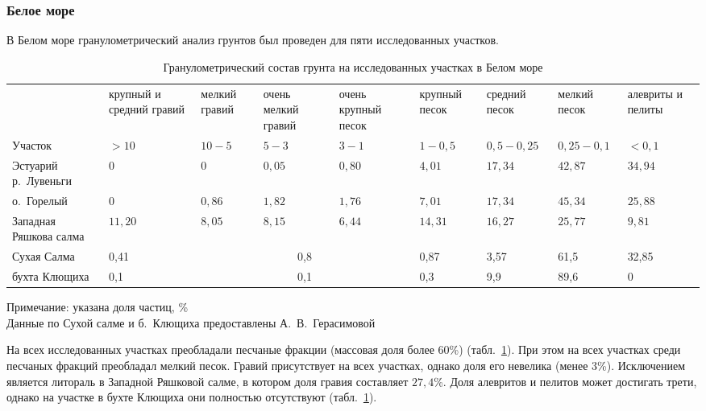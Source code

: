             \subsubsection{Белое море}
В Белом море гранулометрический анализ грунтов был проведен для пяти исследованных участков.
    \begin{table}[p]
    \caption{Гранулометрический состав грунта на исследованных участках в Белом море}
    \label{tab:grunt_granulometriya_White}
    \begin{tabularx}{\textwidth}{|p{}|*{8}{X|}} \hline
    & круп\-ный и сред\-ний гравий  &  мел\-кий гра\-вий &  очень мел\-кий гра\-вий & очень круп\-ный песок & круп\-ный песок &  сред\-ний песок & мел\-кий песок & алеври\-ты и пели\-ты \\
        Участок &   $>10$ &  $10-5$ &   $5-3$ &  $3-1$ & $1-0,5$ &   $0,5-0,25$ &    $0,25-0,1$ &    $<0,1$
        \\ \hline
	Эстуарий р.~Лувеньги           & $0$  & $0$ & $0,05$ & $0,80$ & $4,01$  & $17,34$  & $42,87$ & $34,94$          \\ \hline
	о.~Горелый   & $0$  & $0,86$ & $1,82$ & $1,76$ & $7,01$  & $17,34$  & $45,34$ & $25,88$          \\ \hline
	Западная Ряшкова салма& $11,20$ & $8,05$ & $8,15$ & $6,44$ & $14,31$ & $16,27$  & $25,77$ & $9,81$           \\         \hline
	Сухая Салма                    & 0,41           & \multicolumn{3}{c|}{0,8}    & 0,87            & 3,57             & 61,5            & 32,85             \\ \hline
	бухта Клющиха                  & 0,1            & \multicolumn{3}{c|}{0,1}    & 0,3             & 9,9              & 89,6            & 0                 \\ \hline
    \end{tabularx}

    {\footnotesize Примечание: указана доля частиц, \% \\
Данные по Сухой салме и б.~Клющиха предоставлены А.~В.~Герасимовой}
    \end{table}
На всех исследованных участках преобладали песчаные фракции (массовая доля более $60$\%) (табл.~\ref{tab:grunt_granulometriya_White}).
При этом на всех участках среди песчаных фракций преобладал мелкий песок.
Гравий присутствует на всех участках, однако доля его невелика (менее $3$\%).
Исключением является литораль в Западной Ряшковой салме, в котором доля гравия составляет $27,4$\%.
Доля алевритов и пелитов может достигать трети, однако на участке в бухте Клющиха они полностью отсутствуют (табл.~\ref{tab:grunt_granulometriya_White}).




